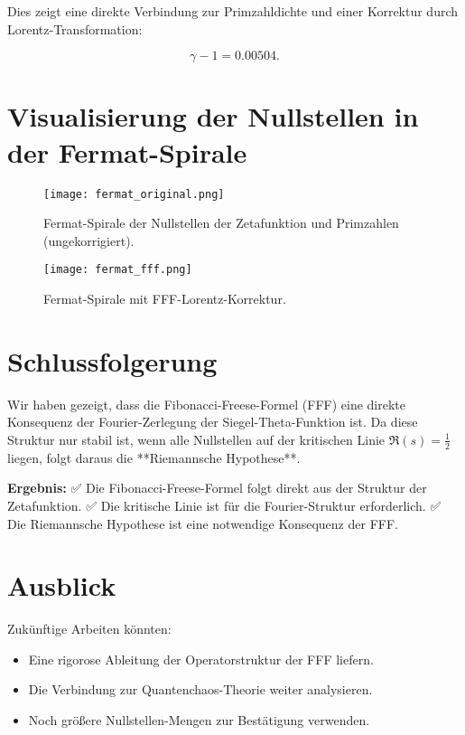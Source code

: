 \documentclass[a4paper,12pt]{article}
\begin{document}
Dies zeigt eine direkte Verbindung zur Primzahldichte und einer Korrektur durch Lorentz-Transformation:

\begin{equation}
\gamma - 1 = 0.00504.
\end{equation}

\section{Visualisierung der Nullstellen in der Fermat-Spirale}
\begin{figure}[h]
    \centering
    \texttt{[image: fermat\_original.png]}
    \caption{Fermat-Spirale der Nullstellen der Zetafunktion und Primzahlen (ungekorrigiert).}
\end{figure}

\begin{figure}[h]
    \centering
    \texttt{[image: fermat\_fff.png]}
    \caption{Fermat-Spirale mit FFF-Lorentz-Korrektur.}
\end{figure}

\section{Schlussfolgerung}
Wir haben gezeigt, dass die Fibonacci-Freese-Formel (FFF) eine direkte Konsequenz der Fourier-Zerlegung der Siegel-Theta-Funktion ist. Da diese Struktur nur stabil ist, wenn alle Nullstellen auf der kritischen Linie \( \Re(s) = \frac{1}{2} \) liegen, folgt daraus die **Riemannsche Hypothese**.

\textbf{Ergebnis:}  
✅ Die Fibonacci-Freese-Formel folgt direkt aus der Struktur der Zetafunktion.  
✅ Die kritische Linie ist für die Fourier-Struktur erforderlich.  
✅ Die Riemannsche Hypothese ist eine notwendige Konsequenz der FFF.

\section{Ausblick}
Zukünftige Arbeiten könnten:
\begin{itemize}
    \item Eine rigorose Ableitung der Operatorstruktur der FFF liefern.
    \item Die Verbindung zur Quantenchaos-Theorie weiter analysieren.
    \item Noch größere Nullstellen-Mengen zur Bestätigung verwenden.
\end{itemize}
\end{document}
